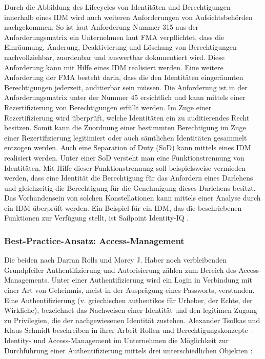 Durch die Abbildung des Lifecycles von Identitäten und Berechtigungen innerhalb eines IDM wird auch weiteren Anforderungen von Aufsichtsbehörden nachgekommen. So ist laut Anforderung Nummer 315 aus der Anforderungsmatrix ein Unternehmen laut FMA verpflichtet, dass die Einräumung, Änderung, Deaktivierung und Löschung von Berechtigungen nachvollziehbar, zuordenbar und auswertbar dokumentiert wird. Diese Anforderung kann mit Hilfe eines IDM realisiert werden.
\bigbreak
Eine weitere Anforderung der FMA besteht darin, dass die den Identitäten eingeräumten Berechtigungen jederzeit, auditierbar sein müssen. Die Anforderung ist in der Anforderungsmatrix unter der Nummer 45 ersichtlich und kann mittels einer Rezertifizierung von Berechtigungen erfüllt werden. Im Zuge einer Rezertifizierung wird überprüft, welche Identitäten ein zu auditierendes Recht besitzen. Somit kann die Zuordnung einer bestimmten Berechtigung im Zuge einer Rezertifizierung legitimiert oder auch sämtlichen Identitäten gesammelt entzogen werden. Auch eine \glqq{}Separation of Duty\grqq{} (SoD) kann mittels eines IDM realisiert werden. Unter einer SoD versteht man eine Funktionstrennung von Identitäten. Mit Hilfe dieser Funktionstrennung soll beispielsweise vermieden werden, dass eine Identität die Berechtigung für das Anfordern eines Darlehens und gleichzeitig die Berechtigung für die Genehmigung dieses Darlehens besitzt. Das Vorhandensein von solchen Konstellationen kann mittels einer Analyse durch ein IDM überprüft werden.
\bigbreak
Ein Beispiel für ein IDM, das die beschriebenen Funktionen zur Verfügung stellt, ist \glqq{}Sailpoint Identity-IQ\grqq{} \autocite{Sailpoint_Identity_IQ}.

\subsubsection{Best-Practice-Ansatz: Access-Management}
Die beiden nach Darran Rolls und Morey J. Haber noch verbleibenden Grundpfeiler \glqq{}Authentifizierung\grqq{} und \glqq{}Autorisierung\grqq{} zählen zum Bereich des Access-Managements. 
\bigbreak
Unter einer Authentifizierung wird ein Login in Verbindung mit einer Art von Geheimnis, meist in der Ausprägung eines Passworts, verstanden. Eine Authentifizierung (v. griechischen \glqq{}authentikos\grqq{} für Urheber, der Echte, der Wirkliche), bezeichnet das Nachweisen einer Identität und den legitimen Zugang zu Privilegien, die der nachgewiesenen Identität zustehen. Alexander Tsolkas und Klaus Schmidt beschreiben in ihrer Arbeit \glqq{}Rollen und Berechtigungskonzepte - Identity- und Access-Management im Unternehmen\grqq{} die Möglichkeit zur Durchführung einer Authentifizierung mittels drei unterschiedlichen Objekten \autocite{TsolkasAlexander2010RuB:}: 

